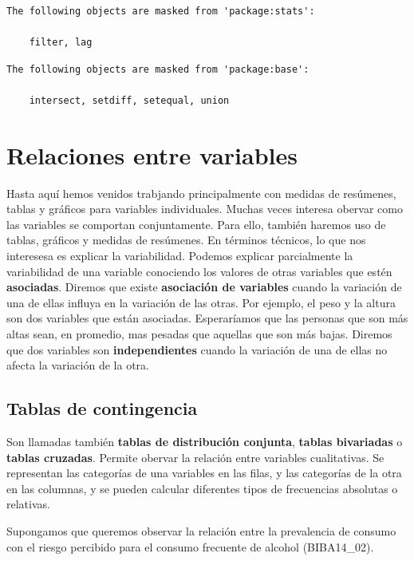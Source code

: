 \documentclass[spanish,]{book}
\begin{document}
\begin{verbatim}
The following objects are masked from 'package:stats':

    filter, lag
\end{verbatim}

\begin{verbatim}
The following objects are masked from 'package:base':

    intersect, setdiff, setequal, union
\end{verbatim}

\chapter{Relaciones entre variables}\label{relaciones-entre-variables}

Hasta aquí hemos venidos trabjando principalmente con medidas de
resúmenes, tablas y gráficos para variables individuales. Muchas veces
interesa obervar como las variables se comportan conjuntamente. Para
ello, también haremos uso de tablas, gráficos y medidas de resúmenes. En
términos técnicos, lo que nos interesesa es explicar la variabilidad.
Podemos explicar parcialmente la variabilidad de una variable conociendo
los valores de otras variables que estén \textbf{asociadas}. Diremos que
existe \textbf{asociación de variables} cuando la variación de una de
ellas influya en la variación de las otras. Por ejemplo, el peso y la
altura son dos variables que están asociadas. Esperaríamos que las
personas que son más altas sean, en promedio, mas pesadas que aquellas
que son más bajas. Diremos que dos variables son \textbf{independientes}
cuando la variación de una de ellas no afecta la variación de la otra.

\section{Tablas de contingencia}\label{tablas-de-contingencia}

Son llamadas también \textbf{tablas de distribución conjunta},
\textbf{tablas bivariadas} o \textbf{tablas cruzadas}. Permite obervar
la relación entre variables cualitativas. Se representan las categorías
de una variables en las filas, y las categorías de la otra en las
columnas, y se pueden calcular diferentes tipos de frecuencias absolutas
o relativas.

Supongamos que queremos observar la relación entre la prevalencia de
consumo con el riesgo percibido para el consumo frecuente de alcohol
(BIBA14\_02).
\end{document}
